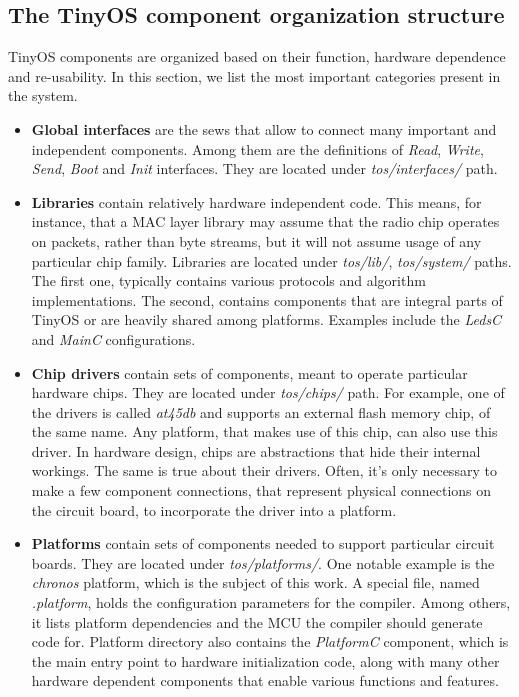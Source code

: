 \subsection{The TinyOS component organization structure}

TinyOS components are organized based on their function, hardware
dependence and re-usability. In this section, we list the most
important categories present in the system.

\begin{itemize}
  \item {\bf Global interfaces} are the sews that allow to connect
    many important and independent components. Among them are the
    definitions of \emph{Read}, \emph{Write}, \emph{Send}, \emph{Boot}
    and \emph{Init} interfaces. They are located under
    \emph{tos/interfaces/} path.

  \item {\bf Libraries} contain relatively hardware independent code.
    This means, for instance, that a MAC layer library may assume that
    the radio chip operates on packets, rather than byte streams, but
    it will not assume usage of any particular chip family. Libraries
    are located under \emph{tos/lib/}, \emph{tos/system/} paths. The
    first one, typically contains various protocols and algorithm
    implementations. The second, contains components that are
    integral parts of TinyOS or are heavily shared among platforms.
    Examples include the \emph{LedsC} and \emph{MainC} configurations.

  \item {\bf Chip drivers} contain sets of components, meant to
    operate particular hardware chips. They are located under
    \emph{tos/chips/} path. For example, one of the drivers is called
    \emph{at45db} and supports an external flash memory chip, of the
    same name. Any platform, that makes use of this chip, can also use
    this driver. In hardware design, chips are abstractions that hide
    their internal workings. The same is true about their
    drivers. Often, it's only necessary to make a few component
    connections, that represent physical connections on the circuit
    board, to incorporate the driver into a platform.

  \item {\bf Platforms} contain sets of components needed to support
    particular circuit boards. They are located under
    \emph{tos/platforms/}. One notable example is the \emph{chronos}
    platform, which is the subject of this work. A special file, named
    \emph{.platform}, holds the configuration parameters for the
    compiler. Among others, it lists platform dependencies and the
    MCU the compiler should generate code for. Platform
    directory  also contains the \emph{PlatformC} component, which is
    the main entry point to hardware initialization code, along with
    many other hardware dependent components that enable various
    functions and features.


\end{itemize}
